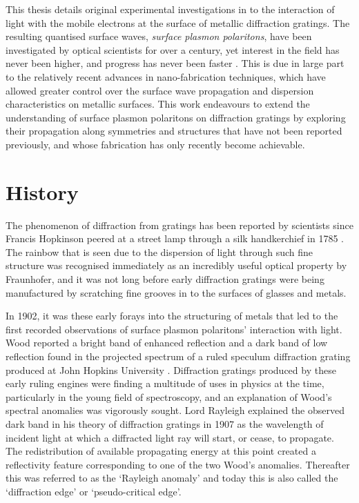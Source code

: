 This thesis details original experimental investigations in to the interaction of light with the mobile electrons at the surface of metallic diffraction gratings. The resulting quantised surface waves, \textit{surface plasmon polaritons}, have been investigated by optical scientists for over a century, yet interest in the field has never been higher, and progress has never been faster \cite{Barnes2003,Editorial2012}. This is due in large part to the relatively recent advances in nano-fabrication techniques, which have allowed greater control over the surface wave propagation and dispersion characteristics on metallic surfaces. This work endeavours to extend the understanding of surface plasmon polaritons on diffraction gratings by exploring their propagation along symmetries and structures that have not been reported previously, and whose fabrication has only recently become achievable.

\section{History}
The phenomenon of diffraction from gratings has been reported by scientists since Francis Hopkinson peered at a street lamp through a silk handkerchief in 1785 \cite{Rittenhause1786,loewen1997diffraction}. The rainbow that is seen due to the dispersion of light through such fine structure was recognised immediately as an incredibly useful optical property by Fraunhofer, and it was not long before early diffraction gratings were being manufactured by scratching fine grooves in to the surfaces of glasses and metals.

In 1902, it was these early forays into the structuring of metals that led to the first recorded observations of surface plasmon polaritons' interaction with light. Wood \cite{Light} reported a bright band of enhanced reflection and a dark band of low reflection found in the projected spectrum of a ruled speculum diffraction grating produced at John Hopkins University \cite{Strong1960}. Diffraction gratings produced by these early ruling engines were finding a multitude of uses in physics at the time, particularly in the young field of spectroscopy, and an explanation of Wood's spectral anomalies was vigorously sought. Lord Rayleigh explained the observed dark band in his theory of diffraction gratings in 1907 \cite{Rayleigh1907a} as the wavelength of incident light at which a diffracted light ray will start, or cease, to propagate. The redistribution of available propagating energy at this point created a reflectivity feature corresponding to one of the two Wood's anomalies. Thereafter this was referred to as the `Rayleigh anomaly'  and today this is also called the `diffraction edge' or `pseudo-critical edge'.

